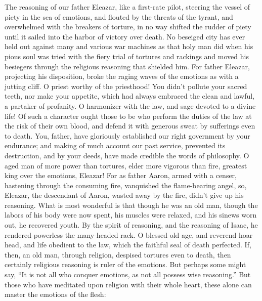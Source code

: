  The reasoning of our father Eleazar, like a first-rate
pilot, steering the vessel of piety in the sea of emotions,
 and flouted by the threats of the tyrant, and overwhelmed
with the breakers of torture,  in no way shifted the
rudder of piety until it sailed into the harbor of victory over death.
 No beseiged city has ever held out against many and
various war machines as that holy man did when his pious soul was tried
with the fiery trial of tortures and rackings and moved his besiegers
through the religious reasoning that shielded him.  For
father Eleazar, projecting his disposition, broke the raging waves of
the emotions as with a jutting cliff.  O priest worthy of
the priesthood! You didn't pollute your sacred teeth, nor make your
appetite, which had always embraced the clean and lawful, a partaker of
profanity.  O harmonizer with the law, and sage devoted to
a divine life!  Of such a character ought those to be who
perform the duties of the law at the risk of their own blood, and defend
it with generous sweat by sufferings even to death.  You,
father, have gloriously established our right government by your
endurance; and making of much account our past service, prevented its
destruction, and by your deeds, have made credible the words of
philosophy.  O aged man of more power than tortures,
elder more vigorous than fire, greatest king over the emotions, Eleazar!
 For as father Aaron, armed with a censer, hastening
through the consuming fire, vanquished the flame-bearing angel,
 so, Eleazar, the descendant of Aaron, wasted away by the
fire, didn't give up his reasoning.  What is most
wonderful is that though he was an old man, though the labors of his
body were now spent, his muscles were relaxed, and his sinews worn out,
he recovered youth.  By the spirit of reasoning, and the
reasoning of Isaac, he rendered powerless the many-headed rack.
 O blessed old age, and reverend hoar head, and life
obedient to the law, which the faithful seal of death perfected.
 If, then, an old man, through religion, despised
tortures even to death, then certainly religious reasoning is ruler of
the emotions.  But perhaps some might say, ``It is not
all who conquer emotions, as not all possess wise reasoning.''
 But those who have meditated upon religion with their
whole heart, these alone can master the emotions of the flesh:

